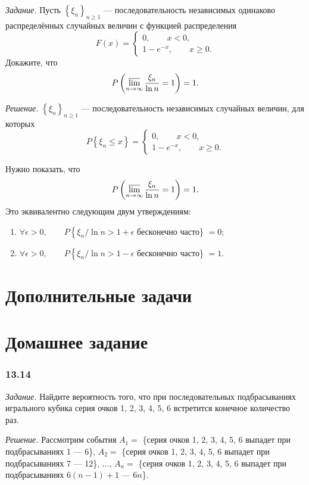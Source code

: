 \textit{Задание.} Пусть $ \left\{ \xi_n \right\}_{n \geq 1}$ --- последовательность независимых одинаково распределённых случайных величин с функцией распределения
$$F \left( x \right) =
\begin{cases}
0, \qquad x < 0, \\
1 - e^{-x}, \qquad x \geq 0.
\end{cases}$$
Докажите, что
$$P \left( \varlimsup \limits_{n \to \infty } \frac{ \xi_n}{ \ln n} = 1 \right) =
1.$$

\textit{Решение.} $ \left\{ \xi_n \right\}_{n \geq 1}$ --- последовательность независимых случайных величин, для которых
$$P \left\{ \xi_n \leq x \right\} =
\begin{cases}
0, \qquad x < 0, \\
1 - e^{-x}, \qquad x \geq 0.
\end{cases}$$

Нужно показать, что
$$P \left( \varlimsup \limits_{n \to \infty } \frac{ \xi_n}{ \ln n} = 1 \right) =
1.$$
Это эквивалентно следующим двум утверждениям:
\begin{enumerate}
\item $ \forall \epsilon > 0, \qquad P \left\{ \xi_n / \ln n > 1 + \epsilon \right.$ бесконечно часто\} $= 0$;
\item $ \forall \epsilon > 0, \qquad P \left\{ \xi_n / \ln n > 1 - \epsilon \right.$ бесконечно часто\} $= 1$.
\end{enumerate}

\section*{Дополнительные задачи}

\section*{Домашнее задание}

\subsubsection*{13.14}

\textit{Задание.} Найдите вероятность того, что при последовательных подбрасываниях игрального кубика серия очков 1, 2, 3, 4, 5, 6 встретится конечное количество раз.

\textit{Решение.}
Рассмотрим события $A_1 =$ \{серия очков 1, 2, 3, 4, 5, 6 выпадет при подбрасываниях 1 --- 6\},
$A_2 =$ \{серия очков 1, 2, 3, 4, 5, 6 выпадет при подбрасываниях 7 --- 12\},
$ \dotsc, \, A_n =$ \{серия очков 1, 2, 3, 4, 5, 6 выпадет при подбрасываниях $6(n-1)+1$ --- $6n$\}.

